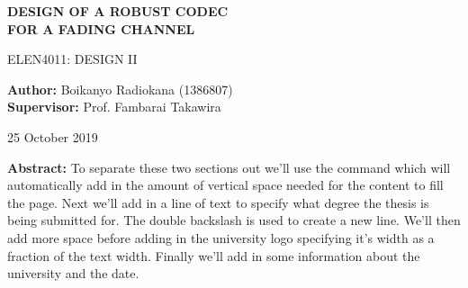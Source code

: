 \begin{titlepage}
\begin{center}
\textbf{\Large DESIGN OF A ROBUST CODEC \\ \vspace{0.2cm} FOR A FADING CHANNEL}

\vspace{0.5cm}
         ELEN4011: DESIGN II
 
       \vspace{1.5cm}
 
       \textbf{Author:} Boikanyo Radiokana (1386807) \\
       \vspace{1.5cm}
       \textbf{Supervisor:} Prof. Fambarai Takawira
       \vspace{1cm}
       
       25 October 2019
       \vfill

\begin{adjustwidth}{5mm}{}
\textbf{Abstract:} To separate these two sections out we'll use the command which will automatically add in the amount of vertical space needed for the content to fill the page. Next we'll add in a line of text to specify what degree the thesis is being submitted for. The double backslash is used to create a new line. We'll then add more space before adding in the university logo specifying it's width as a fraction of the text width. Finally we'll add in some information about the university and the date.
\end{adjustwidth}

       

       
 
   \end{center}
\end{titlepage}